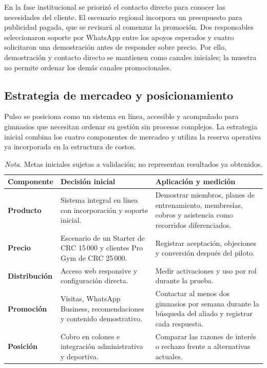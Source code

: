 En la fase institucional se priorizó el contacto directo para conocer las
necesidades del cliente. El escenario regional incorpora un presupuesto para
publicidad pagada, que se revisará al comenzar la promoción. Dos
responsables seleccionaron soporte por WhatsApp entre los apoyos esperados y
cuatro solicitaron una demostración antes de responder sobre precio. Por ello,
demostración y contacto directo se mantienen como canales iniciales; la muestra
no permite ordenar los demás canales promocionales.

\subsection{Estrategia de mercadeo y posicionamiento}

Pulso se posiciona como un sistema en línea, accesible y acompañado para
gimnasios que necesitan ordenar su gestión sin procesos complejos. La
estrategia inicial combina los cuatro componentes de mercadeo y utiliza la
reserva operativa ya incorporada en la estructura de costos.

\begin{table}[htbp]
\caption{Estrategia inicial de mercadeo}
\begin{tabularx}{\textwidth}{>{\bfseries}p{2.8cm}X X}
\toprule
Componente & Decisión inicial & Aplicación y medición \\
\midrule
Producto & Sistema integral en línea con incorporación y soporte inicial. & Demostrar miembros, planes de entrenamiento, membresías, cobros y asistencia como recorridos diferenciados. \\
Precio & Escenario de un Starter de CRC 15\,000 y clientes Pro Gym de CRC 25\,000. & Registrar aceptación, objeciones y conversión después del piloto. \\
Distribución & Acceso web responsive y configuración directa. & Medir activaciones y uso por rol durante la prueba. \\
Promoción & Visitas, WhatsApp Business, recomendaciones y contenido demostrativo. & Contactar al menos dos gimnasios por semana durante la búsqueda del aliado y registrar cada respuesta. \\
Posición & Cobro en colones e integración administrativa y deportiva. & Comparar las razones de interés o rechazo frente a alternativas actuales. \\
\bottomrule
\end{tabularx}
\caption*{\textit{Nota}. Metas iniciales sujetas a validación; no representan resultados ya obtenidos.}
\end{table}

